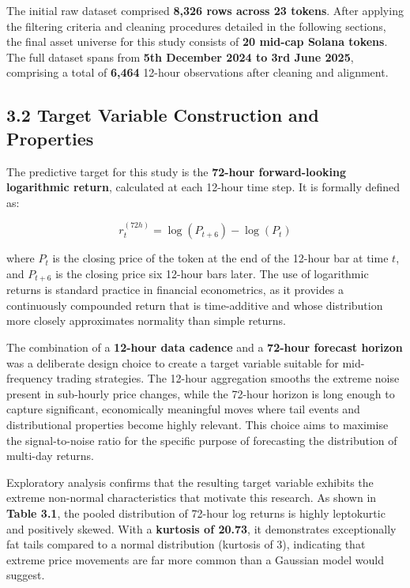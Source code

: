 \documentclass[
  a4paper,
  DIV=11,
  numbers=noendperiod]{scrreprt}
\begin{document}
The initial raw dataset comprised \textbf{8,326 rows across 23 tokens}.
After applying the filtering criteria and cleaning procedures detailed
in the following sections, the final asset universe for this study
consists of \textbf{20 mid-cap Solana tokens}. The full dataset spans
from \textbf{5th December 2024 to 3rd June 2025}, comprising a total of
\textbf{6,464} 12-hour observations after cleaning and alignment.

\subsection{3.2 Target Variable Construction and
Properties}\label{target-variable-construction-and-properties}

The predictive target for this study is the \textbf{72-hour
forward-looking logarithmic return}, calculated at each 12-hour time
step. It is formally defined as:

\[r^{(72h)}_t = \log(P_{t+6}) - \log(P_t)\]

where \(P_t\) is the closing price of the token at the end of the
12-hour bar at time \(t\), and \(P_{t+6}\) is the closing price six
12-hour bars later. The use of logarithmic returns is standard practice
in financial econometrics, as it provides a continuously compounded
return that is time-additive and whose distribution more closely
approximates normality than simple returns.

The combination of a \textbf{12-hour data cadence} and a \textbf{72-hour
forecast horizon} was a deliberate design choice to create a target
variable suitable for mid-frequency trading strategies. The 12-hour
aggregation smooths the extreme noise present in sub-hourly price
changes, while the 72-hour horizon is long enough to capture
significant, economically meaningful moves where tail events and
distributional properties become highly relevant. This choice aims to
maximise the signal-to-noise ratio for the specific purpose of
forecasting the distribution of multi-day returns.

Exploratory analysis confirms that the resulting target variable
exhibits the extreme non-normal characteristics that motivate this
research. As shown in \textbf{Table 3.1}, the pooled distribution of
72-hour log returns is highly leptokurtic and positively skewed. With a
\textbf{kurtosis of 20.73}, it demonstrates exceptionally fat tails
compared to a normal distribution (kurtosis of 3), indicating that
extreme price movements are far more common than a Gaussian model would
suggest.
\end{document}
